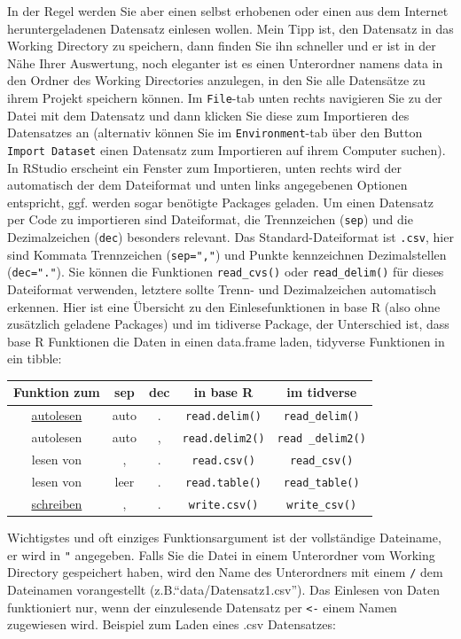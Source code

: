 \documentclass[
]{book}
\theoremstyle{definition}
\theoremstyle{definition}
\theoremstyle{definition}
\theoremstyle{definition}
\theoremstyle{remark}
\begin{document}
In der Regel werden Sie aber einen selbst erhobenen oder einen aus dem Internet heruntergeladenen Datensatz einlesen wollen. Mein Tipp ist, den Datensatz in das Working Directory zu speichern, dann finden Sie ihn schneller und er ist in der Nähe Ihrer Auswertung, noch eleganter ist es einen Unterordner namens data in den Ordner des Working Directories anzulegen, in den Sie alle Datensätze zu ihrem Projekt speichern können. Im \texttt{File}-tab unten rechts navigieren Sie zu der Datei mit dem Datensatz und dann klicken Sie diese zum Importieren des Datensatzes an (alternativ können Sie im \texttt{Environment}-tab über den Button \texttt{Import\ Dataset} einen Datensatz zum Importieren auf ihrem Computer suchen). In RStudio erscheint ein Fenster zum Importieren, unten rechts wird der automatisch der dem Dateiformat und unten links angegebenen Optionen entspricht, ggf. werden sogar benötigte Packages geladen. Um einen Datensatz per Code zu importieren sind Dateiformat, die Trennzeichen (\texttt{sep}) und die Dezimalzeichen (\texttt{dec}) besonders relevant. Das Standard-Dateiformat ist \texttt{.csv}, hier sind Kommata Trennzeichen (\texttt{sep=","}) und Punkte kennzeichnen Dezimalstellen (\texttt{dec="."}). Sie können die Funktionen \texttt{read\_cvs()} oder \texttt{read\_delim()} für dieses Dateiformat verwenden, letztere sollte Trenn- und Dezimalzeichen automatisch erkennen. Hier ist eine Übersicht zu den Einlesefunktionen in base R (also ohne zusätzlich geladene Packages) und im tidiverse Package, der Unterschied ist, dass base R Funktionen die Daten in einen data.frame laden, tidyverse Funktionen in ein tibble:

\begin{longtable}[]{@{}ccccc@{}}
\toprule
Funktion zum & sep & dec & in base R & im tidverse \\
\midrule
\endhead
\underline{autolesen} & auto & . & \texttt{read.delim()} & \texttt{read\_delim()} \\
autolesen & auto & , & \texttt{read.delim2()} & \texttt{read\ \_delim2()} \\
lesen von & , & . & \texttt{read.csv()} & \texttt{read\_csv()} \\
lesen von & leer & . & \texttt{read.table()} & \texttt{read\_table()} \\
\underline{schreiben} & , & . & \texttt{write.csv()} & \texttt{write\_csv()} \\
\bottomrule
\end{longtable}

Wichtigstes und oft einziges Funktionsargument ist der vollständige Dateiname, er wird in \texttt{"} angegeben. Falls Sie die Datei in einem Unterordner vom Working Directory gespeichert haben, wird den Name des Unterordners mit einem \texttt{/} dem Dateinamen vorangestellt (z.B.``data/Datensatz1.csv''). Das Einlesen von Daten funktioniert nur, wenn der einzulesende Datensatz per \texttt{\textless{}-} einem Namen zugewiesen wird. Beispiel zum Laden eines .csv Datensatzes:
\end{document}

